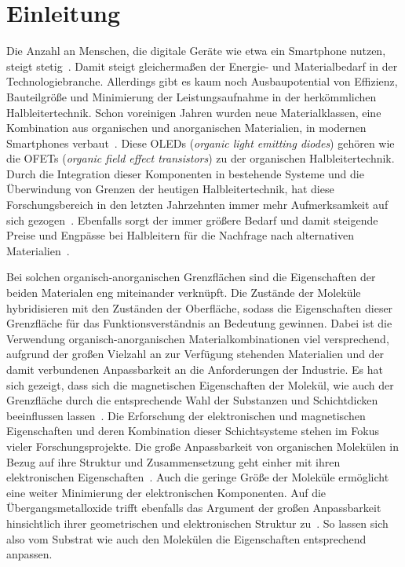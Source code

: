\chapter{Einleitung}
    Die Anzahl an Menschen, die digitale Geräte wie etwa ein Smartphone nutzen, steigt stetig~\cite{Statista}.
    Damit steigt gleichermaßen der Energie- und Materialbedarf in der Technologiebranche.
    Allerdings gibt es kaum noch Ausbaupotential von Effizienz, Bauteilgröße und Minimierung der Leistungsaufnahme in der herkömmlichen Halbleitertechnik.
    Schon voreinigen Jahren wurden neue Materialklassen, eine Kombination aus organischen und anorganischen Materialien, in modernen Smartphones verbaut~\cite{MAC}.
    Diese OLEDs (\textit{organic light emitting diodes}) gehören wie die OFETs (\textit{organic field effect transistors}) zu der organischen Halbleitertechnik.
    Durch die Integration dieser Komponenten in bestehende Systeme und die Überwindung von Grenzen der heutigen Halbleitertechnik, hat diese Forschungsbereich in den letzten Jahrzehnten immer mehr Aufmerksamkeit auf sich gezogen~\cite{Uni-Tübingen}.
    Ebenfalls sorgt der immer größere Bedarf und damit steigende Preise und Engpässe bei Halbleitern für die Nachfrage nach alternativen Materialien~\cite{Idealo}.

    Bei solchen organisch-anorganischen Grenzflächen sind die Eigenschaften der beiden Materialen eng miteinander verknüpft.
    Die Zustände der Moleküle hybridisieren mit den Zuständen der Oberfläche, sodass die Eigenschaften dieser Grenzfläche für das Funktionsverständnis an Bedeutung gewinnen.
    Dabei ist die Verwendung organisch-anorganischen Materialkombinationen viel versprechend, aufgrund der großen Vielzahl an zur Verfügung stehenden Materialien und der damit verbundenen Anpassbarkeit an die Anforderungen der Industrie.
    Es hat sich gezeigt, dass sich die magnetischen Eigenschaften der Molekül, wie auch der Grenzfläche durch die entsprechende Wahl der Substanzen und Schichtdicken beeinflussen lassen~\cite{IF_16}.
    Die Erforschung der elektronischen und magnetischen Eigenschaften und deren Kombination dieser Schichtsysteme stehen im Fokus vieler Forschungsprojekte.
    Die große Anpassbarkeit von organischen Molekülen in Bezug auf ihre Struktur und Zusammensetzung geht einher mit ihren elektronischen Eigenschaften~\cite{scholl_chapter_2018}.
    Auch die geringe Größe der Moleküle ermöglicht eine weiter Minimierung der elektronischen Komponenten.
    Auf die Übergangsmetalloxide trifft ebenfalls das Argument der großen Anpassbarkeit hinsichtlich ihrer geometrischen und elektronischen Struktur zu~\cite{5A_4}.
    So lassen sich also vom Substrat wie auch den Molekülen die Eigenschaften entsprechend anpassen. %

